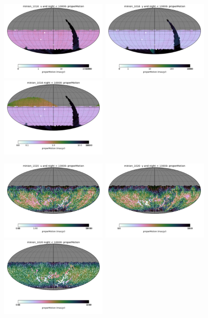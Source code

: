 \begin{figure}[ht]
  \begin{center}
  \includegraphics[width=2.0in]{./figs/milkyway/astromPanels/MW_Astrom_pmError_Baseline_u_map.png}
  \includegraphics[width=2.0in]{./figs/milkyway/astromPanels/MW_Astrom_pmError_Baseline_y_map.png}
  \includegraphics[width=2.0in]{./figs/milkyway/astromPanels/MW_Astrom_pmError_Baseline_10y_map.png}
  \end{center}
  \begin{center}
  \includegraphics[width=2.0in]{./figs/milkyway/astromPanels/MW_Astrom_pmError_PanSTARRS_u_map.png}
  \includegraphics[width=2.0in]{./figs/milkyway/astromPanels/MW_Astrom_pmError_PanSTARRS_y_map.png}
  \includegraphics[width=2.0in]{./figs/milkyway/astromPanels/MW_Astrom_pmError_PanSTARRS_10y_map.png}
  \end{center}


\end{figure}
